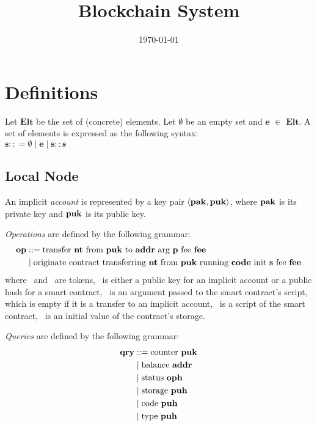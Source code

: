 \documentclass[a4paper]{llncs}
\title{Blockchain System}
\author{}
\institute{}
\date{\today}
\begin{document}
\maketitle
\pagestyle{plain}

\section{Definitions}
\begin{definition}%
Let $\mathbf{Elt}$ be the set of (concrete) elements. Let $\emptyset$ be an empty set and $\mathbf{e}$ $\in$  $\mathbf{Elt}$. A set of elements is expressed as the following syntax:
\\
$\mathbf{s} :: = \emptyset \mid \mathbf{e} \mid \mathbf{s :: s}$
\end{definition}

\subsection{Local Node}
\label{sec:local-node}


\begin{definition}%
  An implicit \emph{account} is represented by a key pair $\langle
  \PAK, \PUK
  \rangle $, where
  $\PAK$ is its private key and $\PUK$ is its public key.
\end{definition}


\begin{definition}%
  \emph{Operations} are defined by the following grammar:
  \begin{align*}
    \OP &::= \TRANSFER[\PARAMETER]\NTEZ\PUK\ADDR\MTEZ
    \\&\mid \ORIGINATE\NTEZ\PUK\CODE\INIT\MTEZ
  \end{align*}
  where \NTEZ\ and \MTEZ\ are tokens, \ADDR\ is either a public
  key for an implicit account  or a public hash for a smart contract,
  \PARAMETER\ is an argument passed to the smart contract's script,
  which is empty if it is a transfer to an implicit account, \CODE\ is
  a script of the smart contract, \INIT\ is an initial value of the
  contract's storage. 
\end{definition}

\begin{definition}%
\emph{Queries} are defined by the following grammar:
\begin{align*}
  \QRY & ::=
  \GETCOUNTER\PUK  
  \\&\mid \GETBALANCE\ADDR
  \\&\mid \GETSTATUS\OPH
  \\&\mid \GETSTORAGE\PUH
  \\&\mid \GETCODE\PUH 
  \\&\mid \GETTYPE\PUH
\end{align*}
\end{definition}
\end{document}

